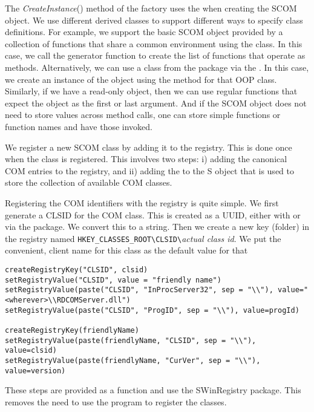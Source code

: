 \documentclass{article}
\def\COMMethod#1{\textsl{#1}()}
\begin{document}
The \COMMethod{CreateInstance} method of the factory uses the
 when creating the SCOM object.  We use
different derived classes to support different ways to specify class
definitions. For example, we support the basic SCOM object provided by
a collection of functions that share a common environment using the
 class.  In this case, we call the
generator function to create the list of functions that operate as
methods.  Alternatively, we can use a class from the 
package via the .  In this case, we create
an instance of the object using the  method for that
OOP class.  Similarly, if we have a read-only object, then we can use
regular functions that expect the object as the first or last
argument.  And if the SCOM object does not need to store values across
method calls, one can store simple functions or function names
and have those invoked.

We register a new SCOM class by adding it to the registry.  This is
done once when the class is registered.  This involves two steps: i)
adding the canonical COM entries to the registry, and ii) adding the
 to the S object that is used to store the
collection of available COM classes.

Registering the COM identifiers with the registry is quite simple.  We
first generate a CLSID for the COM class.  This is created as a UUID,
either with  or via the  package.
We convert this to a string.  Then we create a new key (folder) in the
registry named \verb+HKEY_CLASSES_ROOT\CLSID\+\textit{actual class
id}.  We put the convenient, client name for this class as
the default value for that 

\begin{verbatim}
createRegistryKey("CLSID", clsid)
setRegistryValue("CLSID", value = "friendly name")
setRegistryValue(paste("CLSID", "InProcServer32", sep = "\\"), value="<wherever>\\RDCOMServer.dll")
setRegistryValue(paste("CLSID", "ProgID", sep = "\\"), value=progId)

createRegistryKey(friendlyName)
setRegistryValue(paste(friendlyName, "CLSID", sep = "\\"), value=clsid)
setRegistryValue(paste(friendlyName, "CurVer", sep = "\\"), value=version)
\end{verbatim}
These steps are provided as a function and use the SWinRegistry package.
This removes the need to use the  program
to register the classes.
\end{document}
